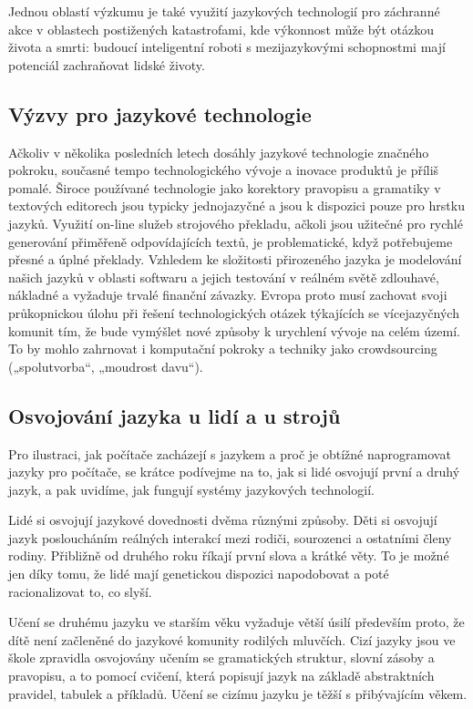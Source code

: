 \begin{multicols}{2}
Jednou oblastí výzkumu je také využití jazykových technologií pro záchranné akce v oblastech postižených katastrofami, kde výkonnost může být otázkou života a smrti: budoucí inteligentní roboti s mezijazykovými schopnostmi mají potenciál zachraňovat lidské životy.

\subsection{Výzvy pro jazykové technologie}

Ačkoliv v několika posledních letech dosáhly jazykové technologie značného pokroku, současné tempo technologického vývoje a inovace produktů je příliš pomalé. Široce používané technologie jako korektory pravopisu a gramatiky v textových editorech jsou typicky jednojazyčné a jsou k dispozici pouze pro hrstku jazyků. Využití on-line služeb strojového překladu, ačkoli jsou užitečné pro rychlé generování přiměřeně odpovídajících textů, je problematické, když potřebujeme přesné a úplné překlady. Vzhledem ke složitosti přirozeného jazyka je modelování našich jazyků v oblasti softwaru a jejich testování v reálném světě zdlouhavé, nákladné a vyžaduje trvalé finanční závazky. Evropa proto musí zachovat svoji průkopnickou úlohu při řešení technologických otázek týkajících se vícejazyčných komunit tím, že bude vymýšlet nové způsoby k urychlení vývoje na celém území. To by mohlo zahrnovat i komputační pokroky a techniky jako crowdsourcing („spolutvorba“, „moudrost davu“).

\subsection{Osvojování jazyka u lidí a u strojů}

Pro ilustraci, jak počítače zacházejí s jazykem a proč je obtížné naprogramovat jazyky pro počítače, se krátce podívejme na to, jak si lidé osvojují první a druhý jazyk, a pak uvidíme, jak fungují systémy jazykových technologií.

Lidé si osvojují jazykové dovednosti dvěma různými způsoby. Děti si osvojují jazyk posloucháním reálných interakcí mezi rodiči, sourozenci a ostatními členy rodiny. Přibližně od druhého roku říkají první slova a krátké věty. To je možné jen díky tomu, že lidé mají genetickou dispozici napodobovat a poté racionalizovat to, co slyší.

Učení se druhému jazyku ve starším věku vyžaduje větší úsilí především proto, že dítě není začleněné do jazykové komunity rodilých mluvčích. Cizí jazyky jsou ve škole zpravidla osvojovány učením se gramatických struktur, slovní zásoby a pravopisu, a to pomocí cvičení, která popisují jazyk na základě abstraktních pravidel, tabulek a příkladů. Učení se cizímu jazyku je těžší s přibývajícím věkem.


\end{multicols}
